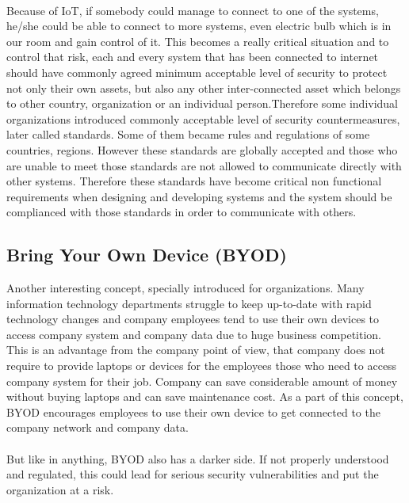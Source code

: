 \paragraph{}
Because of IoT, if somebody could manage to connect to one of the systems, he/she could be able to connect to more systems, even electric bulb which is in our room and gain control of it. This becomes a really critical situation and to control that risk, each and every system that has been connected to internet should have commonly agreed minimum acceptable level of security to protect not only their own assets, but also any other inter-connected asset which belongs to other country, organization or an individual person.Therefore some individual organizations introduced commonly acceptable level of security countermeasures, later called standards. Some of them became rules and regulations of some countries, regions. However these standards are globally accepted and those who are unable to meet those standards are not allowed to communicate directly with other systems. Therefore these standards have become critical non functional requirements when designing and developing systems and the system should be complianced with those standards in order to communicate with others.

\subsection{Bring Your Own Device (BYOD)}
Another interesting concept, specially introduced for organizations. Many information technology departments struggle to keep up-to-date with rapid technology changes and company employees tend to use their own devices to access company system and company data due to huge business competition. This is an advantage from the company point of view, that company does not require to provide laptops or devices for the employees those who need to access company system for their job. Company can save considerable amount of money without buying laptops and can save maintenance cost. As a part of this concept, BYOD encourages employees to use their own device to get connected to the company network and company data.

\paragraph{}
But like in anything, BYOD also has a darker side. If not properly understood and regulated, this could lead for serious security vulnerabilities and put the organization at a risk. 

